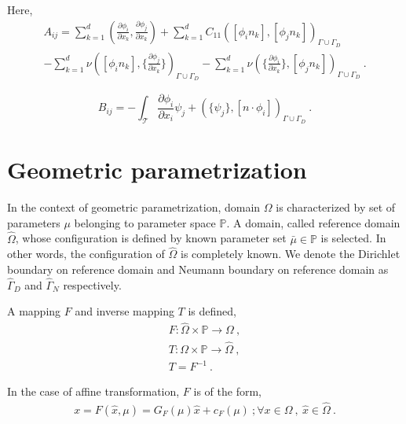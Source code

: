 \documentclass[graybox]{svmult}
\begin{document}
Here, 
\begin{equation} \label{matrix A}
\begin{split}
A_{ij} = \sum_{k=1}^d (\frac{\partial \phi_i}{\partial x_k} , \frac{\partial \phi_j}{\partial x_k}) + \sum_{k=1}^d C_{11} ([\phi_i n_k] , [\phi_j n_k])_{\Gamma \cup \Gamma_D} \\ - \sum_{k=1}^d \nu ([\phi_i n_k] , \lbrace \frac{\partial \phi_j}{\partial x_k} \rbrace)_{\Gamma \cup \Gamma_D} - \sum_{k=1}^d \nu (\lbrace \frac{\partial \phi_i}{\partial x_k} \rbrace , [\phi_j n_k])_{\Gamma \cup \Gamma_D} \ .
\end{split}
\end{equation}

\begin{equation} \label{matrix B}
B_{ij} = - \int_{\mathcal{T}} \frac{\partial \phi_i}{\partial x_i} \psi_j +
(\lbrace \psi_j \rbrace , [n \cdot \phi_i])_{\Gamma \cup \Gamma_D} \ .
\end{equation}


\section{Geometric parametrization}

In the context of geometric parametrization, domain $\Omega$ is characterized by set of parameters $\mu$ belonging to parameter space $\mathbb{P}$. A domain, called reference domain $\hat{\Omega}$, whose configuration is defined by known parameter set $\bar{\mu} \in \mathbb{P}$ is selected. In other words, the configuration of $\hat{\Omega}$ is completely known. We denote the Dirichlet boundary on reference domain and Neumann boundary on reference domain as $\hat{\Gamma}_D$ and  $\hat{\Gamma}_N$ respectively. 

A mapping $F$ and inverse mapping $T$ is defined,
\begin{equation}
\begin{split}
F : \hat{\Omega} \times \mathbb{P} \rightarrow \Omega \ , \\
T : \Omega \times \mathbb{P} \rightarrow \hat{\Omega} \ , \\
T = F^{-1} \ .
\end{split}
\end{equation}

In the case of affine transformation, $F$ is of the form,
\begin{gather}\label{affine_F}
x = F(\hat{x},\mu) = G_F(\mu)\hat{x} + c_F(\mu) \ ; \forall x \in \Omega \ , \ \hat{x} \in \hat{\Omega} \ .
\end{gather}
\end{document}
